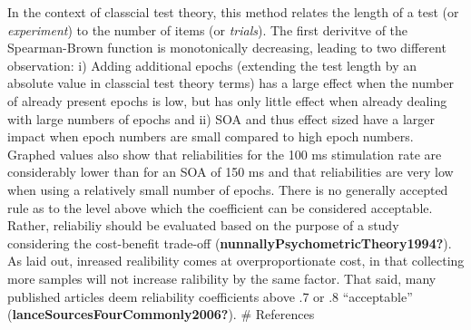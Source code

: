 \documentclass[twoside, man, a4paper,12pt, nofontenc]{apa7}
\begin{document}
In the context of classcial test theory, this method relates the length
of a test (or \emph{experiment}) to the number of items (or
\emph{trials}). The first derivitve of the Spearman-Brown function is
monotonically decreasing, leading to two different observation: i)
Adding additional epochs (extending the test length by an absolute value
in classcial test theory terms) has a large effect when the number of
already present epochs is low, but has only little effect when already
dealing with large numbers of epochs and ii) SOA and thus effect sized
have a larger impact when epoch numbers are small compared to high epoch
numbers. Graphed values also show that reliabilities for the 100 ms
stimulation rate are considerably lower than for an SOA of 150 ms and
that reliabilities are very low when using a relatively small number of
epochs. There is no generally accepted rule as to the level above which
the coefficient can be considered acceptable. Rather, reliabiliy should
be evaluated based on the purpose of a study considering the
cost-benefit trade-off (\textbf{nunnallyPsychometricTheory1994?}). As
laid out, inreased realibility comes at overproportionate cost, in that
collecting more samples will not increase ralibility by the same factor.
That said, many published articles deem reliability coefficients above
.7 or .8 \enquote{acceptable} (\textbf{lanceSourcesFourCommonly2006?}).
\newpage \# References
\end{document}

